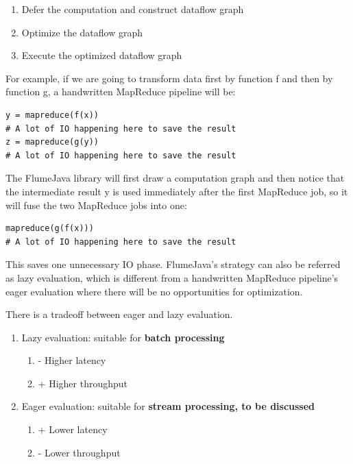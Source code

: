 \documentclass[twoside]{article}
\begin{document}
\begin{enumerate}
\item Defer the computation and construct dataflow graph
\item Optimize the dataflow graph
\item Execute the optimized dataflow graph
\end{enumerate}

For example, if we are going to transform data first by function f and then by function g, a handwritten MapReduce pipeline will be:

\begin{lstlisting}
y = mapreduce(f(x))
# A lot of IO happening here to save the result
z = mapreduce(g(y))
# A lot of IO happening here to save the result
\end{lstlisting}

The FlumeJava library will first draw a computation graph and then notice that the intermediate result y is used immediately after the first MapReduce job, so it will fuse the two MapReduce jobs into one:

\begin{lstlisting}
mapreduce(g(f(x)))
# A lot of IO happening here to save the result
\end{lstlisting}

This saves one unnecessary IO phase. FlumeJava’s strategy can also be referred as lazy evaluation, which is different from a handwritten MapReduce pipeline’s eager evaluation where there will be no opportunities for optimization.

There is a tradeoff between eager and lazy evaluation.

\begin{enumerate}
	\item Lazy evaluation: suitable for \textbf{batch processing}
    \begin{enumerate}
		\item - Higher latency
        \item + Higher throughput
	\end{enumerate}
	\item Eager evaluation: suitable for \textbf{stream processing, to be discussed}
    \begin{enumerate}
		\item + Lower latency
        \item - Lower throughput
	\end{enumerate}
\end{enumerate}
\end{document}
